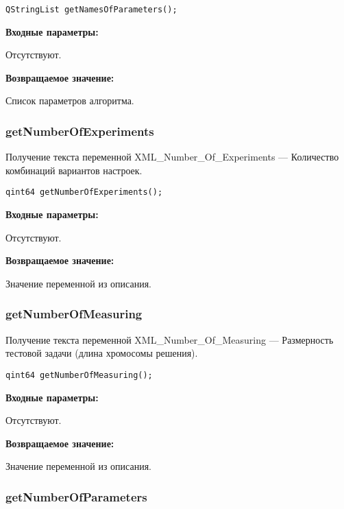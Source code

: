 \documentclass[a4paper,12pt]{article}
\begin{document}
\begin{lstlisting}[label=code_syntax_getNamesOfParameters,caption=Синтаксис]
QStringList getNamesOfParameters();
\end{lstlisting}

\textbf{Входные параметры:}

Отсутствуют.

\textbf{Возвращаемое значение:}

Список параметров алгоритма.


\subsubsection{getNumberOfExperiments}\label{getNumberOfExperiments}

Получение текста переменной  XML\_Number\_Of\_Experiments --- Количество комбинаций вариантов настроек.


\begin{lstlisting}[label=code_syntax_getNumberOfExperiments,caption=Синтаксис]
qint64 getNumberOfExperiments();
\end{lstlisting}

\textbf{Входные параметры:}

Отсутствуют.

\textbf{Возвращаемое значение:}

Значение переменной из описания.


\subsubsection{getNumberOfMeasuring}\label{getNumberOfMeasuring}

Получение текста переменной  XML\_Number\_Of\_Measuring --- Размерность тестовой задачи (длина хромосомы решения).


\begin{lstlisting}[label=code_syntax_getNumberOfMeasuring,caption=Синтаксис]
qint64 getNumberOfMeasuring();
\end{lstlisting}

\textbf{Входные параметры:}

Отсутствуют.

\textbf{Возвращаемое значение:}

Значение переменной из описания.


\subsubsection{getNumberOfParameters}\label{getNumberOfParameters}
\end{document}
